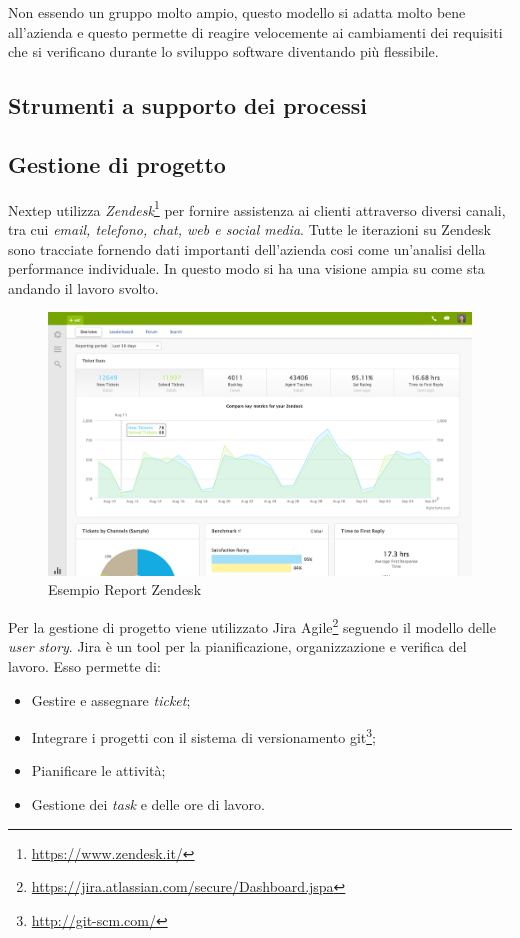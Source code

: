 Non essendo un gruppo molto ampio, questo modello si adatta molto bene all'azienda e questo permette di reagire velocemente ai cambiamenti dei requisiti che si verificano durante lo sviluppo software diventando più flessibile.

\subsection{Strumenti a supporto dei processi}
\subsection*{Gestione di progetto}
Nextep utilizza \textit{Zendesk}\footnote{\url{https://www.zendesk.it/}} per fornire assistenza ai clienti attraverso diversi canali, tra cui \textit{email, telefono, chat, web e social media}. Tutte le iterazioni su Zendesk sono tracciate fornendo dati importanti dell'azienda cosi come un'analisi della performance individuale. In questo modo si ha una visione ampia su come sta andando il lavoro svolto.

\begin{figure}[h]
\centering
\includegraphics[width=0.8\linewidth]{immagini/reporting}
\caption[Esempio Report Zendesk]{Esempio Report Zendesk}
\label{fig:reporting}
\end{figure}

\newpage
Per la gestione di progetto viene utilizzato Jira Agile\footnote{\url{https://jira.atlassian.com/secure/Dashboard.jspa}} seguendo il modello delle \textit{user story}. Jira è un tool per la pianificazione, organizzazione e verifica del lavoro. Esso permette di:
\begin{itemize}
	\item Gestire e assegnare \textit{ticket};
	\item Integrare i progetti con il sistema di versionamento \gls{git}\footnote{\url{http://git-scm.com/}};
	\item Pianificare le attività;
	\item Gestione dei \textit{task }e delle ore di lavoro.
\end{itemize}


